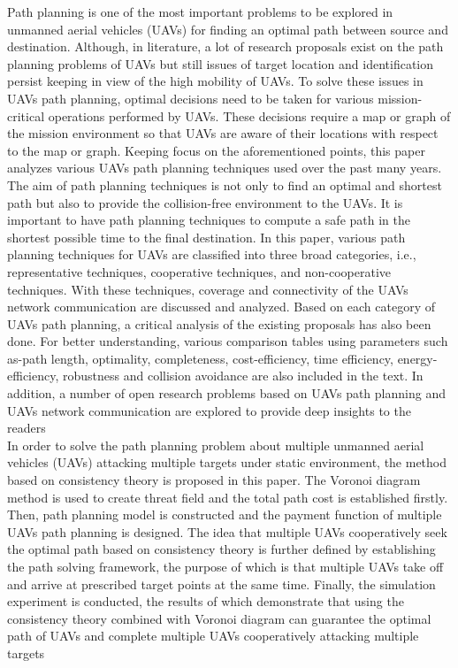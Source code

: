 \documentclass[11pt,epsf,times]{article}
\begin{document}
Path planning is one of the most important problems to be explored in unmanned aerial vehicles (UAVs) for finding an optimal path between source and destination. Although, in literature, a lot of research proposals exist on the path planning problems of UAVs but still issues of target location and identification persist keeping in view of the high mobility of UAVs. To solve these issues in UAVs path planning, optimal decisions need to be taken for various mission-critical operations performed by UAVs. These decisions require a map or graph of the mission environment so that UAVs are aware of their locations with respect to the map or graph. Keeping focus on the aforementioned points, this paper analyzes various UAVs path planning techniques used over the past many years. The aim of path planning techniques is not only to find an optimal and shortest path but also to provide the collision-free environment to the UAVs. It is important to have path planning techniques to compute a safe path in the shortest possible time to the final destination. In this paper, various path planning techniques for UAVs are classified into three broad categories, i.e., representative techniques, cooperative techniques, and non-cooperative techniques. With these techniques, coverage and connectivity of the UAVs network communication are discussed and analyzed. Based on each category of UAVs path planning, a critical analysis of the existing proposals has also been done. For better understanding, various comparison tables using parameters such as-path length, optimality, completeness, cost-efficiency, time efficiency, energy-efficiency, robustness and collision avoidance are also included in the text. In addition, a number of open research problems based on UAVs path planning and UAVs network communication are explored to provide deep insights to the readers \cite{PathPlanning2022}\\

In order to solve the path planning problem about multiple unmanned aerial vehicles (UAVs) attacking multiple targets under static environment, the method based on consistency theory is proposed in this paper. The Voronoi diagram method is used to create threat field and the total path cost is established firstly. Then, path planning model is constructed and the payment function of multiple UAVs path planning is designed. The idea that multiple UAVs cooperatively seek the optimal path based on consistency theory is further defined by establishing the path solving framework, the purpose of which is that multiple UAVs take off and arrive at prescribed target points at the same time. Finally, the simulation experiment is conducted, the results of which demonstrate that using the consistency theory combined with Voronoi diagram can guarantee the optimal path of UAVs and complete multiple UAVs cooperatively attacking multiple targets \cite{Chen2017}\\
\end{document}
